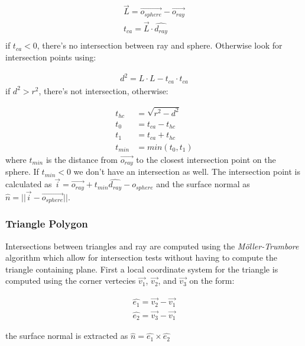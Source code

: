 \documentclass[a4paper, twocolumn]{article}
\begin{document}
        \begin{align*}
            \vec{L} = \vec{o_{sphere}} - \vec{o_{ray}} \\
            t_{ca} = \vec{L} \cdot  \hat{d_{ray}} \\
        \end{align*}
        if \(t_{ca} < 0\), there's no intersection between ray and sphere. Otherwise look for intersection points using:
        
        \begin{align*}
            d^2 = L \cdot L - t_{ca} \cdot t_{ca}
        \end{align*}
        if \(d^2 > r^2\), there's not intersection, otherwise:

        \begin{align*}
            t_{hc} &= \sqrt{r^2 - d^2} \\
            t_0 &= t_{ca} - t_{hc} \\
            t_1 &= t_{ca} + t_{hc} \\
            t_{min} &= min(t_0, t_1)
        \end{align*}
        where \(t_{min}\) is the distance from \(\vec{o_{ray}}\) to the closest intersection point on the sphere. If \(t_{min}  < 0\) we don't have an intersection as well. The intersection point is calculated as  \(\vec{i} = \vec{o_{ray}} + t_{min} \hat{d_{ray}} - o_{sphere} \) and the surface normal as \( \hat{n} = || \vec{i} - \vec{o_{sphere}} || \).

        \subsubsection{Triangle Polygon} \label{sec:triangle_polygon}
        
        Intersections between triangles and ray are computed using the \textit{Möller-Trumbore} algorithm which allow for intersection tests without having to compute the triangle containing plane. First a local coordinate system for the triangle is computed using the corner vertecies \(\vec{v_1}\), \(\vec{v_2}\), and \(\vec{v_3}\) on the form:

\begin{align*}
    \hat{e_1} = \vec{v_2} - \vec{v_1} \\
    \hat{e_2} = \vec{v_3} - \vec{v_1}
\end{align*}

the surface normal is extracted as \( \hat{n} =\hat{e_1} \times \hat{e_2} \)
\end{document}
